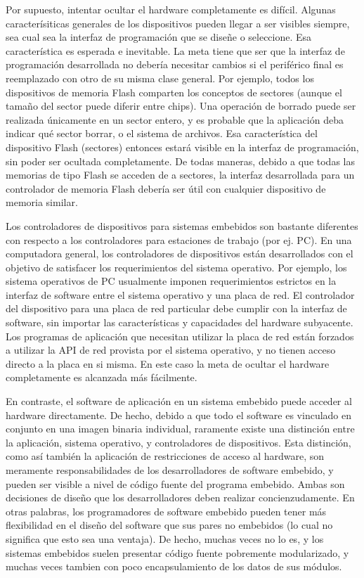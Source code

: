 \documentclass[output=paper, 
colorlinks,
citecolor=brown,
newtxmath
]{langscibook}
\begin{document}
Por supuesto, intentar ocultar el hardware completamente es difícil. 
Algunas caracterísiticas generales de los dispositivos pueden llegar
a ser visibles siempre, sea cual
sea la interfaz de programación que se diseñe o seleccione.
Esa característica es esperada e inevitable. La meta tiene que ser 
que la interfaz de programación
desarrollada no debería necesitar cambios si el periférico final es reemplazado
con otro de su misma clase general. Por ejemplo, todos los dispositivos de memoria
Flash comparten los conceptos de sectores (aunque el tamaño del sector
puede diferir entre chips). Una operación de borrado puede ser realizada
únicamente en un sector entero, y es probable que la aplicación deba indicar
qué sector borrar, o el sistema de archivos. Esa característica del dispositivo 
Flash (sectores) entonces estará visible en la interfaz de programación,
sin poder ser ocultada completamente. De todas maneras, debido a que todas
las memorias de tipo Flash se acceden de a sectores, 
la interfaz desarrollada
para un controlador de memoria Flash debería ser útil con cualquier
dispositivo de memoria similar.

Los controladores de dispositivos para sistemas embebidos son bastante
diferentes con respecto a los controladores para estaciones de trabajo (por ej. PC).
En una computadora general, los controladores de dispositivos están
desarrollados con el objetivo de satisfacer los requerimientos del sistema
operativo. Por ejemplo, los sistema operativos de PC usualmente imponen
requerimientos estrictos en la interfaz de software entre el sistema operativo
y una placa de red. El controlador del dispositivo para una placa de red particular
debe cumplir con la interfaz de software, sin importar las características
y capacidades del hardware subyacente. Los programas de aplicación que 
necesitan utilizar la placa de red están forzados a utilizar la API
de red provista por el sistema operativo, y no tienen acceso directo a la
placa en si misma. En este caso la meta de ocultar el hardware completamente
es alcanzada más fácilmente.

En contraste, el software de aplicación en un sistema embebido  puede acceder al
hardware directamente. De hecho, debido a que todo el software es
vinculado en conjunto en una imagen binaria individual, raramente existe una
distinción entre la aplicación, sistema operativo, y controladores
de dispositivos.
Esta distinción, como así también la aplicación de restricciones de acceso 
al hardware,
son meramente responsabilidades de los desarrolladores de software embebido,
y pueden ser visible a nivel de código fuente del programa embebido.
Ambas son decisiones de diseño que los desarrolladores deben realizar
concienzudamente. En otras palabras, los programadores de software 
embebido pueden tener más flexibilidad en el diseño del software
que sus pares no embebidos (lo cual no significa que esto sea
una ventaja). De hecho, muchas veces no lo es, y los sistemas embebidos
suelen presentar código fuente pobremente modularizado, y muchas
veces tambien con poco encapsulamiento de los datos de sus módulos.
\end{document}
